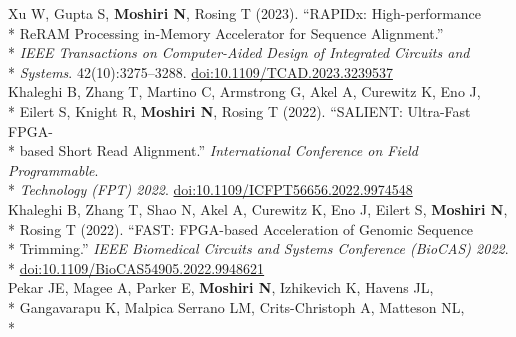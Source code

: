 \documentclass[margin,line]{res}
\begin{document}
\begin{resume}
\hspace*{4mm} Xu W, Gupta S, \textbf{Moshiri N}, Rosing T (2023). ``RAPIDx: High-performance\\*
\hspace*{9mm} ReRAM Processing in-Memory Accelerator for Sequence Alignment.''\\*
\hspace*{9mm} \textit{IEEE Transactions on Computer-Aided Design of Integrated Circuits and}\\*\vspace{2mm}
\hspace*{8mm} \textit{Systems}. 42(10):3275--3288. \href{https://doi.org/10.1109/TCAD.2023.3239537}{doi:10.1109/TCAD.2023.3239537}\\
\hspace*{4mm} Khaleghi B, Zhang T, Martino C, Armstrong G, Akel A, Curewitz K, Eno J,\\*
\hspace*{9mm} Eilert S, Knight R, \textbf{Moshiri N}, Rosing T (2022). ``SALIENT: Ultra-Fast FPGA-\\*
\hspace*{9mm} based Short Read Alignment.'' \textit{International Conference on Field Programmable}.\\*\vspace{2mm}
\hspace*{7mm} \textit{Technology (FPT) 2022}. \href{https://doi.org/10.1109/ICFPT56656.2022.9974548}{doi:10.1109/ICFPT56656.2022.9974548}\\
\hspace*{4mm} Khaleghi B, Zhang T, Shao N, Akel A, Curewitz K, Eno J, Eilert S, \textbf{Moshiri N},\\*
\hspace*{9mm} Rosing T (2022). ``FAST: FPGA-based Acceleration of Genomic Sequence\\*
\hspace*{9mm} Trimming.'' \textit{IEEE Biomedical Circuits and Systems Conference (BioCAS) 2022}.\\*\vspace{2mm}
\hspace*{8mm} \href{https://doi.org/10.1109/BioCAS54905.2022.9948621}{doi:10.1109/BioCAS54905.2022.9948621}\\
\hspace*{4mm} Pekar JE, Magee A, Parker E, \textbf{Moshiri N}, Izhikevich K, Havens JL,\\*
\hspace*{9mm} Gangavarapu K, Malpica Serrano LM, Crits-Christoph A, Matteson NL,\\*

\end{resume}
\end{document}
